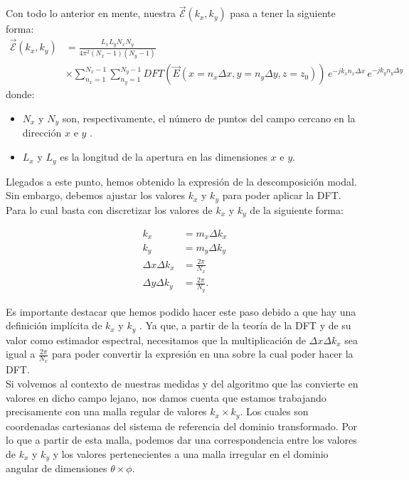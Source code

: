\documentclass{article}
\begin{document}
Con todo lo anterior en mente,  nuestra $\vec{\mathcal{E}}(k_{x},k_{y})$ pasa a tener la siguiente forma: 
\begin{align}
{\vec{\mathcal{E}}}(k_{x},k_{y})&=\frac{L_{x}L_{y}N_{x}N_{y}}{4 \pi^2 (N_{x}-1)(N_{y}-1)} \nonumber \\
&\times \sum_{n_{x}=1}^{N_{x}-1}\sum_{n_{y}=1}^{N_{y}-1} DFT(\vec{E}(x=n_{x}\Delta
x,y=n_{y}\Delta
y,z=z_{0}))\,e^{-j k_{x}n_{x} \Delta x}\,e^{-jk_{y}n_{y} \Delta y}
\label{NFtoFF:eq-fourier}
\end{align}
donde:
\begin{itemize}
    \item $N_{x}$ y $N_{y}$ son, respectivamente, el número de puntos del campo cercano en la dirección $x$ e $y$ .
    \item $L_{x}$ y $L_{y}$  es la longitud de la apertura en las dimensiones  $x$ e $y$.
\end{itemize}

Llegados a este punto, hemos obtenido la expresión de la descomposición modal. Sin embargo, debemos ajustar los valores  $k_{x}$ y $k_{y}$ para poder aplicar la DFT. Para lo cual basta con discretizar los valores de  $k_{x}$ y $k_{y}$  de la siguiente forma: 

\begin{subequations}
\begin{align}
k_{x}&= m_{x}\Delta k_{x}
\\
k_{y}&= m_{y}\Delta k_{y}
\\
\Delta x \Delta k_{x}&=\frac{2\pi}{N_{x}}
\\
\Delta y \Delta k_{y}&=\frac{2\pi}{N_{y}}.
\end{align}
\end{subequations}

Es importante destacar que hemos podido hacer este paso debido a que hay una definición implícita de $k_{x}$ y $k_{y}$ . Ya que, a partir de la teoría de la DFT  y de su valor como estimador espectral, necesitamos que la multiplicación de $\Delta x \Delta k_{x}$ sea igual a $\frac{2\pi}{N_{x}}$ para poder convertir la expresión en una sobre la cual poder hacer la DFT. 
\\

Si volvemos al contexto de nuestras medidas y del algoritmo que las convierte en valores en dicho campo lejano, nos damos cuenta que estamos trabajando precisamente con una malla regular de valores  $k_{x}\times k_{y}$. Los cuales son coordenadas cartesianas del sistema de referencia del dominio transformado. Por lo que a partir de esta malla, podemos dar una correspondencia entre los valores de $k_{x}$ y $k_{y}$ y los valores pertenecientes a una malla irregular en el dominio angular de dimensiones $\theta \times \phi$.
\end{document}
